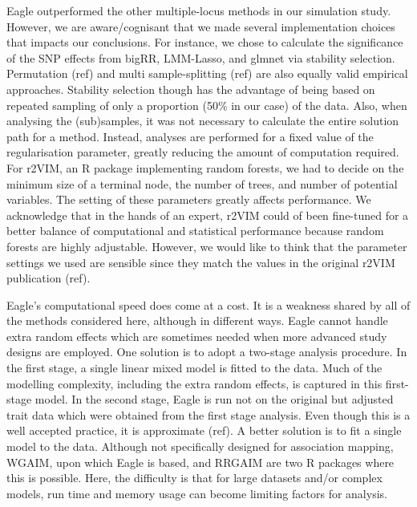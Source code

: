 \documentclass{nature}
\begin{document}
Eagle outperformed the other multiple-locus methods in our simulation study. However, we are aware/cognisant that we made several implementation 
choices that impacts our conclusions.  For instance, we chose to calculate the significance of the 
SNP effects from bigRR, LMM-Lasso, and glmnet via stability selection.  Permutation (ref) and multi sample-splitting (ref) are also equally valid empirical approaches. Stability selection though has the advantage of being based on repeated sampling of only a proportion (50\% in our case) of the 
data. Also, when analysing the (sub)samples, it was not necessary to calculate the entire solution path for a method. 
 Instead,  analyses are 
performed for a fixed value of the regularisation parameter, greatly reducing the amount of computation required. For r2VIM, an R package 
implementing random forests, we had to decide on the  minimum size of a terminal node, the number of trees, and number of potential variables. 
The setting of these parameters greatly affects performance.  We  acknowledge that in the hands of an expert, 
r2VIM could of been fine-tuned for a better balance of computational and statistical performance because random forests are highly adjustable. 
However, we would like to think that the parameter settings we used are sensible since they match the values in the original r2VIM publication (ref). 

Eagle's computational speed does come at a cost. It is a weakness shared by all of the methods considered here, although in different ways. 
Eagle cannot handle extra random effects which are sometimes needed when more advanced study designs are employed. One solution 
is to adopt a two-stage analysis procedure. In the first stage, a single linear mixed model is fitted to the data. Much of the modelling complexity, 
including the extra random effects, is 
captured in this first-stage model. In the second stage, Eagle is run not on the original but adjusted trait data which were obtained from the first stage analysis. Even though this is a well accepted practice, it is approximate (ref).  A better solution is to fit a single model to the data. 
Although not specifically designed for association mapping,
WGAIM, upon which Eagle is based, and RRGAIM are two R packages where this is possible. Here, the difficulty is that for large datasets and/or complex 
models,  run time and memory usage can become limiting factors for analysis. 
\end{document}
